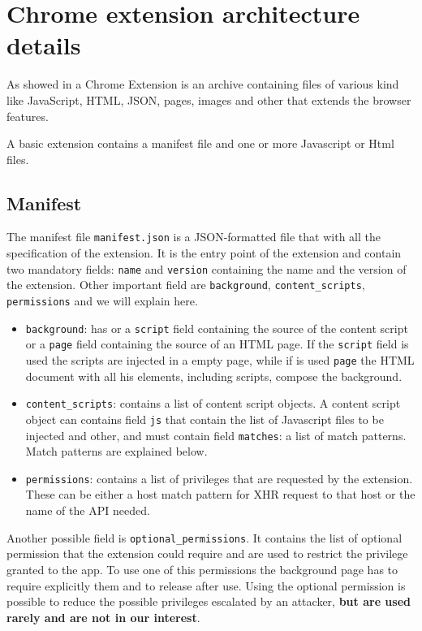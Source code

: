 \section{Chrome extension architecture details}
\label{sec:ExtDetails}
As showed in \cite{ChromeExtensionOnline} a Chrome Extension is an archive containing files of various kind like JavaScript, HTML, JSON, pages, images and other that extends the browser features.

A basic extension contains a manifest file and one or more Javascript or Html files.

\subsection{Manifest}
The manifest file \texttt{manifest.json} is a JSON-formatted file that with all the specification of the extension. It is the entry point of the extension and contain two mandatory fields: \texttt{name} and \texttt{version} containing the name and the version of the extension. Other important field are \texttt{background}, \texttt{content\_scripts}, \texttt{permissions} and we will explain here.
\begin{itemize}
\item \texttt{background}: has or a \texttt{script} field containing the source of the content script or a \texttt{page} field containing the source of an HTML page. If the \texttt{script} field is used the scripts are injected in a empty page, while if is used \texttt{page} the HTML document with all his elements, including scripts, compose the background.
\item \texttt{content\_scripts}: contains a list of content script objects. A content script object can contains field \texttt{js} that contain the list of  Javascript files to be injected and other, and must contain field \texttt{matches}: a list of match patterns. Match patterns are explained below.
\item \texttt{permissions}: contains a list of privileges that are requested by the extension. These can be either a host match pattern for XHR request to that host or the name of the API needed.
\end{itemize}

Another possible field is \texttt{optional\_permissions}. It contains the list of optional permission that the extension could require and are used to restrict the privilege granted to the app. To use one of this permissions the background page has to require explicitly them and to release after use. Using the optional permission is possible to reduce the possible privileges escalated by an attacker, \textbf{but are used rarely and are not in our interest}.

